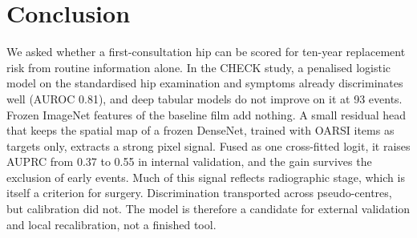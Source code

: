 \section{Conclusion}
\label{sec:conclusion}
We asked whether a first-consultation hip can be scored for ten-year replacement risk from routine information alone. In
the CHECK study, a penalised logistic model on the standardised hip examination and symptoms already discriminates well
(AUROC 0.81), and deep tabular models do not improve on it at 93 events. Frozen ImageNet features of the baseline film
add nothing. A small residual head that keeps the spatial map of a frozen DenseNet, trained with OARSI items as
targets only, extracts a strong pixel signal. Fused as one cross-fitted logit, it raises AUPRC from 0.37 to 0.55 in
internal validation, and the gain survives the exclusion of early events. Much of this signal reflects radiographic
stage, which is itself a criterion for surgery. Discrimination transported across pseudo-centres, but calibration did
not. The model is therefore a candidate for external validation and local recalibration, not a finished tool.
